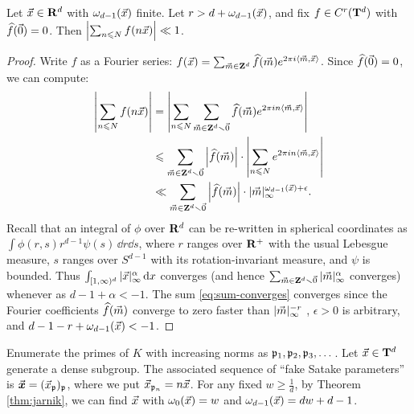 \begin{theorem}\label{thm:translates-bound-sum}
Let $\vec{x}\in \mathbf{R}^d$ with $\omega_{d-1}(\vec{x})$ finite. Let 
$r>d+\omega_{d-1}(\vec{x})$, and fix $f\in C^r(\mathbf{T}^d)$ with $\widehat f(\vec{0})=0$. 
Then $\left| \sum_{n\leqslant N} f(n \vec{x})\right| \ll 1$. 
\end{theorem}
\begin{proof}
Write $f$ as a Fourier series:
$f(\vec{x}) = \sum_{\vec{m}\in \mathbf{Z}^d} \widehat f(\vec{m}) e^{2\pi i \langle \vec{m},\vec{x}\rangle}$. 
Since $\widehat f(\vec{0})=0$, we can compute:
\begin{align}
	\left| \sum_{n\leqslant N} f(n \vec{x})\right| 
		&= \left| \sum_{n\leqslant N} \sum_{\vec{m}\in \mathbf{Z}^d\smallsetminus \vec{0}} \widehat f(\vec{m}) e^{2\pi i n \langle \vec{m},\vec{x}\rangle}\right|\nonumber \\ 
		&\leqslant \sum_{\vec{m}\in \mathbf{Z}^d\smallsetminus \vec{0}} \left|\widehat f(\vec{m})\right|\cdot \left| \sum_{n\leqslant N} e^{2\pi i n \langle \vec{m},\vec{x}\rangle}\right| \nonumber \\ 
		\label{eq:sum-converges}
		&\ll \sum_{\vec{m}\in \mathbf{Z}^d\smallsetminus \vec{0}} \left|\widehat f(\vec{m})\right|\cdot |\vec{m}|_\infty^{\omega_{d-1}(\vec{x}) + \epsilon} . 
\end{align}
Recall that an integral of $\phi$ over $\mathbf{R}^d$ can be re-written in spherical 
coordinates as $\int \phi(r,s) r^{d-1} \psi(s)\, \dd r \dd s$, where 
$r$ ranges over $\mathbf{R}^+$ with the usual Lebesgue measure, $s$ ranges over 
$S^{d-1}$ with its rotation-invariant measure, and $\psi$ is bounded. Thus 
$\int_{[1,\infty)^d} |\vec{x}|_\infty^\alpha\, \mathrm{d} x$ converges (and hence 
$\sum_{\vec{m}\in \mathbf{Z}^d\smallsetminus \vec{0}} |\vec{m}|_\infty^\alpha$ converges)
whenever as $d-1+\alpha < -1$. The sum \eqref{eq:sum-converges} 
converges since the Fourier coefficients $\widehat f(\vec{m})$ converge to 
zero faster than $|\vec{m}|_\infty^{-r}$ \cite[Th.~8.22]{folland-1999}, 
$\epsilon>0$ is arbitrary, and $d-1-r+\omega_{d-1}(\vec{x}) < -1$. 
\end{proof}

Enumerate the primes of $K$ with increasing norms as $\mathfrak{p}_1,\mathfrak{p}_2,\mathfrak{p}_3,\dots$.  
Let $\vec{x}\in \mathbf{T}^d$ generate a dense subgroup.  The associated sequence of 
``fake Satake parameters'' is $\vec{\boldsymbol x} = (\vec{x}_{\mathfrak{p}})_{\mathfrak{p}}$, where we put 
$\vec{x}_{\mathfrak{p}_n} = n \vec{x}$. For any fixed $w\geqslant \frac 1 d$, by Theorem 
\ref{thm:jarnik}, we can find $\vec{x}$ with $\omega_0(\vec{x}) = w$ and 
$\omega_{d-1}(\vec{x}) = d w + d - 1$. 

